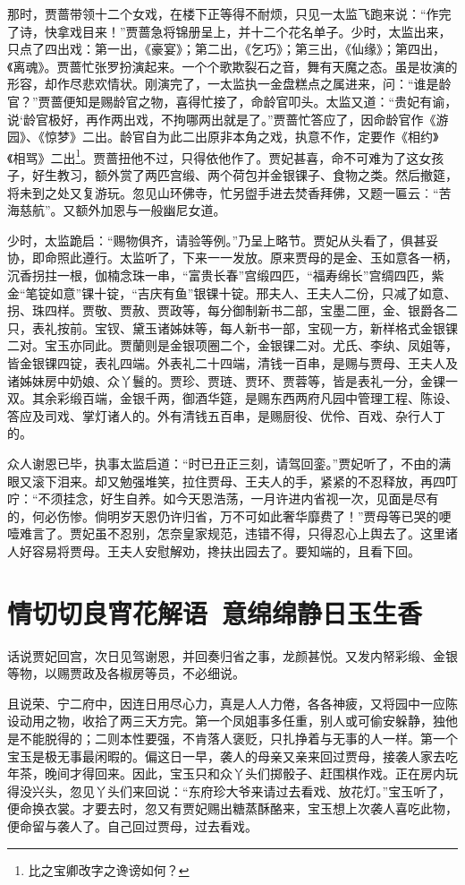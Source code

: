 \documentclass[12pt,oneside]{book}
\begin{document}
那时，贾蔷带领十二个女戏，在楼下正等得不耐烦，只见一太监飞跑来说：“作完了诗，快拿戏目来！”贾蔷急将锦册呈上，并十二个花名单子。少时，太监出来，只点了四出戏：第一出，《豪宴》；第二出，《乞巧》；第三出，《仙缘》；第四出，《离魂》。贾蔷忙张罗扮演起来。一个个歌欺裂石之音，舞有天魔之态。虽是妆演的形容，却作尽悲欢情状。刚演完了，一太监执一金盘糕点之属进来，问：“谁是龄官？”贾蔷便知是赐龄官之物，喜得忙接了，命龄官叩头。太监又道：“贵妃有谕，说‘龄官极好，再作两出戏，不拘哪两出就是了。”贾蔷忙答应了，因命龄官作《游园》、《惊梦》二出。龄官自为此二出原非本角之戏，执意不作，定要作《相约》《相骂》二出\footnote{比之宝卿改字之谗谤如何？}。贾蔷扭他不过，只得依他作了。贾妃甚喜，命不可难为了这女孩子，好生教习，额外赏了两匹宫缎、两个荷包并金银锞子、食物之类。然后撤筵，将未到之处又复游玩。忽见山环佛寺，忙另盥手进去焚香拜佛，又题一匾云︰“苦海慈航”。又额外加恩与一般幽尼女道。

少时，太监跪启：“赐物俱齐，请验等例。”乃呈上略节。贾妃从头看了，俱甚妥协，即命照此遵行。太监听了，下来一一发放。原来贾母的是金、玉如意各一柄，沉香拐拄一根，伽楠念珠一串，“富贵长春”宫缎四匹，“福寿绵长”宫绸四匹，紫金“笔锭如意”锞十锭，“吉庆有鱼”银锞十锭。邢夫人、王夫人二份，只减了如意、拐、珠四样。贾敬、贾赦、贾政等，每分御制新书二部，宝墨二匣，金、银爵各二只，表礼按前。宝钗、黛玉诸姊妹等，每人新书一部，宝砚一方，新样格式金银锞二对。宝玉亦同此。贾蘭则是金银项圈二个，金银锞二对。尤氏、李纨、凤姐等，皆金银锞四锭，表礼四端。外表礼二十四端，清钱一百串，是赐与贾母、王夫人及诸姊妹房中奶娘、众丫鬟的。贾珍、贾琏、贾环、贾蓉等，皆是表礼一分，金锞一双。其余彩缎百端，金银千两，御酒华筵，是赐东西两府凡园中管理工程、陈设、答应及司戏、掌灯诸人的。外有清钱五百串，是赐厨役、优伶、百戏、杂行人丁的。

众人谢恩已毕，执事太监启道：“时已丑正三刻，请驾回銮。”贾妃听了，不由的满眼又滚下泪来。却又勉强堆笑，拉住贾母、王夫人的手，紧紧的不忍释放，再四叮咛：“不须挂念，好生自养。如今天恩浩荡，一月许进内省视一次，见面是尽有的，何必伤惨。倘明岁天恩仍许归省，万不可如此奢华靡费了！”贾母等已哭的哽噎难言了。贾妃虽不忍别，怎奈皇家规范，违错不得，只得忍心上舆去了。这里诸人好容易将贾母。王夫人安慰解劝，搀扶出园去了。要知端的，且看下回。


\chapter{情切切良宵花解语~意绵绵静日玉生香}
话说贾妃回宫，次日见驾谢恩，并回奏归省之事，龙颜甚悦。又发内帑彩缎、金银等物，以赐贾政及各椒房等员，不必细说。

且说荣、宁二府中，因连日用尽心力，真是人人力倦，各各神疲，又将园中一应陈设动用之物，收拾了两三天方完。第一个凤姐事多任重，别人或可偷安躲静，独他是不能脱得的；二则本性要强，不肯落人褒贬，只扎挣着与无事的人一样。第一个宝玉是极无事最闲暇的。偏这日一早，袭人的母亲又亲来回过贾母，接袭人家去吃年茶，晚间才得回来。因此，宝玉只和众丫头们掷骰子、赶围棋作戏。正在房内玩得没兴头，忽见丫头们来回说：“东府珍大爷来请过去看戏、放花灯。”宝玉听了，便命换衣裳。才要去时，忽又有贾妃赐出糖蒸酥酪来，宝玉想上次袭人喜吃此物，便命留与袭人了。自己回过贾母，过去看戏。
\end{document}

